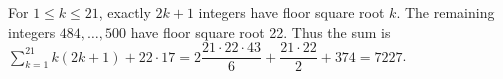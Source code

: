 For $1\le k\le21$, exactly $2k+1$ integers have floor square root $k$. The remaining integers $484,\ldots,500$ have floor square root 22. Thus the sum is $\sum_{k=1}^{21}k(2k+1)+22\cdot17=2\dfrac{21\cdot22\cdot43}{6}+\dfrac{21\cdot22}{2}+374=\boxed{7227}$.
